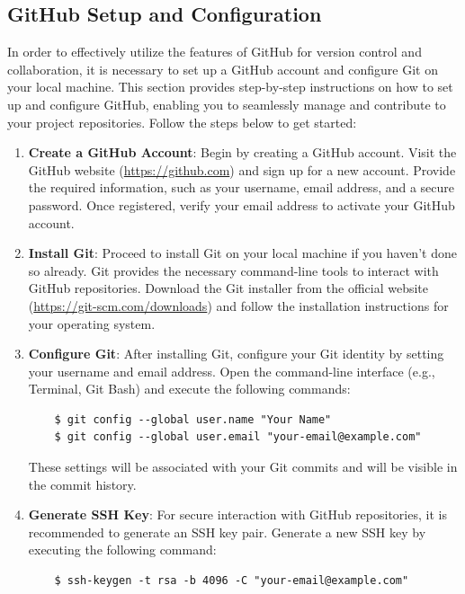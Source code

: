 \subsection{GitHub Setup and Configuration}

In order to effectively utilize the features of GitHub for version control and collaboration, it is necessary to set up a GitHub account and configure Git on your local machine. This section provides step-by-step instructions on how to set up and configure GitHub, enabling you to seamlessly manage and contribute to your project repositories. Follow the steps below to get started:

\begin{enumerate}
    \item \textbf{Create a GitHub Account}: Begin by creating a GitHub account. Visit the GitHub website (\url{https://github.com}) and sign up for a new account. Provide the required information, such as your username, email address, and a secure password. Once registered, verify your email address to activate your GitHub account.
    
    \item \textbf{Install Git}: Proceed to install Git on your local machine if you haven't done so already. Git provides the necessary command-line tools to interact with GitHub repositories. Download the Git installer from the official website (\url{https://git-scm.com/downloads}) and follow the installation instructions for your operating system.
    
    \item \textbf{Configure Git}: After installing Git, configure your Git identity by setting your username and email address. Open the command-line interface (e.g., Terminal, Git Bash) and execute the following commands:
    
    \begin{verbatim}
    $ git config --global user.name "Your Name"
    $ git config --global user.email "your-email@example.com"
    \end{verbatim}
    
    These settings will be associated with your Git commits and will be visible in the commit history.
    
    \item \textbf{Generate SSH Key}: For secure interaction with GitHub repositories, it is recommended to generate an SSH key pair. Generate a new SSH key by executing the following command:
    
    \begin{verbatim}
    $ ssh-keygen -t rsa -b 4096 -C "your-email@example.com"
    \end{verbatim}
    

\end{enumerate}
